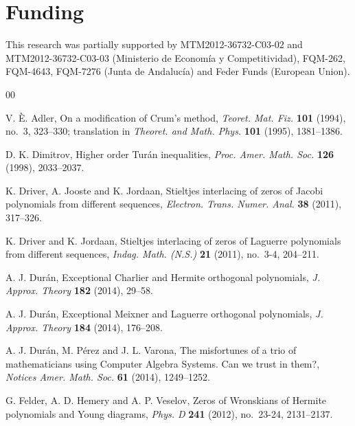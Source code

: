 \documentclass[10pt]{article}
\theoremstyle{plain}
\theoremstyle{definition}
\numberwithin{equation}{section} %
\begin{document}
\section*{Funding}

This research was partially supported by MTM2012-36732-C03-02 and MTM2012-36732-C03-03 (Ministerio de Econom\'ia y Competitividad),
FQM-262, FQM-4643, FQM-7276 (Junta de Andaluc\'ia) and Feder Funds (European Union).


\begin{thebibliography}{00}

V. \`E. Adler,
On a modification of Crum's method,
\textit{Teoret. Mat. Fiz.} \textbf{101} (1994), no.~3, 323--330; translation in
\textit{Theoret. and Math. Phys.} \textbf{101} (1995), 1381--1386.

D. K. Dimitrov,
Higher order Tur\'an inequalities,
\textit{Proc. Amer. Math. Soc.} \textbf{126} (1998), 2033--2037.

K. Driver, A. Jooste and K. Jordaan,
Stieltjes interlacing of zeros of Jacobi polynomials from different sequences,
\textit{Electron. Trans. Numer. Anal.} \textbf{38} (2011), 317--326.

K. Driver and K. Jordaan,
Stieltjes interlacing of zeros of Laguerre polynomials from different sequences,
\textit{Indag. Math. (N.S.)} \textbf{21} (2011), no.~3-4, 204--211.

A. J. Dur\'an,
Exceptional Charlier and Hermite orthogonal polynomials, 
\textit{J. Approx. Theory} \textbf{182} (2014), 29--58.

A. J. Dur\'an,
Exceptional Meixner and Laguerre orthogonal polynomials,
\textit{J. Approx. Theory} \textbf{184} (2014), 176--208.

A. J. Dur\'an, M. P\'erez and J. L. Varona,
The misfortunes of a trio of mathematicians using Computer Algebra Systems. Can we trust in them?,
\textit{Notices Amer. Math. Soc.} \textbf{61} (2014), 1249--1252. 

G. Felder, A. D. Hemery and A. P. Veselov,
Zeros of Wronskians of Hermite polynomials and Young diagrams,
\textit{Phys. D} \textbf{241} (2012), no.~23-24, 2131--2137.


\end{thebibliography}
\end{document}

